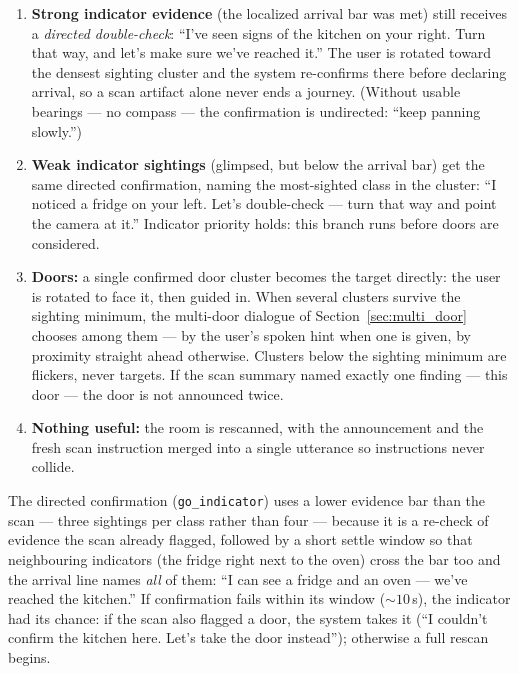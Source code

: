 \begin{enumerate}[nosep]
  \item \textbf{Strong indicator evidence} (the localized arrival bar was met)
        still receives a \emph{directed double-check}: ``I've seen signs of the
        kitchen on your right. Turn that way, and let's make sure we've reached
        it.'' The user is rotated toward the densest sighting cluster and the
        system re-confirms there before declaring arrival, so a scan artifact
        alone never ends a journey. (Without usable bearings --- no compass ---
        the confirmation is undirected: ``keep panning slowly.'')
  \item \textbf{Weak indicator sightings} (glimpsed, but below the arrival bar)
        get the same directed confirmation, naming the most-sighted class in the
        cluster: ``I noticed a fridge on your left. Let's double-check --- turn
        that way and point the camera at it.'' Indicator priority holds: this
        branch runs before doors are considered.
  \item \textbf{Doors:} a single confirmed door cluster becomes the target
        directly: the user is rotated to face it, then guided in. When several
        clusters survive the sighting minimum, the multi-door dialogue of
        Section~\ref{sec:multi_door} chooses among them --- by the user's spoken
        hint when one is given, by proximity straight ahead otherwise. Clusters
        below the sighting minimum are flickers, never targets. If the
        scan summary named exactly one finding --- this door --- the door is not
        announced twice.
  \item \textbf{Nothing useful:} the room is rescanned, with the announcement and
        the fresh scan instruction merged into a single utterance so instructions
        never collide.
\end{enumerate}

The directed confirmation (\texttt{go\_indicator}) uses a lower evidence bar than
the scan --- three sightings per class rather than four --- because it is a
re-check of evidence the scan already flagged, followed by a short settle window so
that neighbouring indicators (the fridge right next to the oven) cross the bar too
and the arrival line names \emph{all} of them: ``I can see a fridge and an oven ---
we've reached the kitchen.'' If confirmation fails within its window
(${\sim}10$\,s), the indicator had its chance: if the scan also flagged a door, the
system takes it (``I couldn't confirm the kitchen here. Let's take the door
instead''); otherwise a full rescan begins.

